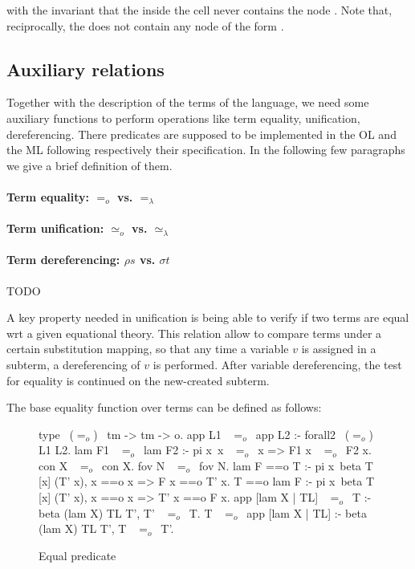 \documentclass[sigconf,natbib=false]{acmart}
\newcommand{\EqualRel}{\ensuremath{=}}
\newcommand{\UnifRel}{\ensuremath{\simeq}}
\newcommand{\Uo}{\ensuremath{\UnifRel_o}\xspace}
\newcommand{\Eo}{\ensuremath{\EqualRel_o}\xspace}
\newcommand{\Ue}{\ensuremath{\UnifRel_\lambda}\xspace}
\newcommand{\Ee}{\ensuremath{\EqualRel_\lambda}\xspace}
\begin{document}
\noindent
with the invariant that the  inside the cell never contains the node
. Note that, reciprocally, the  does not contain
any node of the form .

\subsection{Auxiliary relations}

Together with the description of the terms of the language, we need some
auxiliary functions to perform operations like term equality, unification,
dereferencing. There predicates are supposed to be implemented in the OL and the
ML following respectively their specification. In the following few paragraphs
we give a brief definition of them.

\paragraph{Term equality: \Eo vs. \Ee}
\paragraph{Term unification: \Uo vs. \Ue}
\paragraph{Term dereferencing: $\rho s$ vs. $\sigma t$}
TODO

\old

A key property needed in unification is being able to verify if two terms are
equal wrt a given equational theory. This relation allow to compare terms under
a certain substitution mapping, so that any time a variable $v$ is assigned in a
subterm, a dereferencing of $v$ is performed. After variable dereferencing, the
test for equality is continued on the new-created subterm.

The base equality function over terms can be defined as follows:

\begin{figure}
  \begin{elpicode}
    type ~(\Eo)~ tm -> tm -> o.
    app L1 ~\Eo~app L2 :- forall2 ~(\Eo)~ L1 L2.
    lam F1 ~\Eo~lam F2 :- pi x\ x ~\Eo~x => F1 x ~\Eo~F2 x.
    con X ~\Eo~con X.
    fov N ~\Eo~fov N.
    lam F ==o T :- pi x\ beta T [x] (T' x), 
      x ==o x => F x ==o T' x.
    T ==o lam F :- pi x\ beta T [x] (T' x), 
      x ==o x => T' x ==o F x.
    app [lam X | TL] ~\Eo~T :- beta (lam X) TL T', T' ~\Eo~T.
    T ~\Eo~app [lam X | TL] :- beta (lam X) TL T', T ~\Eo~T'.
  \end{elpicode}
  \caption{Equal predicate}
  \label{code:eq-pred}
\end{figure}
\end{document}
